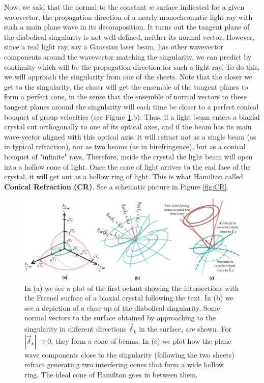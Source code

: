 \documentclass[11pt, a4paper, twoside]{article} %
\begin{document}
Now, we said that the normal to the constant $w$ surface indicated for a given wavevector, the propagation direction of a nearly monochromatic light ray with such a main plane wave in its decomposition. It turns out the tangent plane of the diabolical singularity is not well-defined, neither its normal vector. However, since a real light ray, say a Gaussian laser beam, has other wavevector components around the wavevector matching the singularity, we can predict by continuity which will be the propagation direction for such a light ray. To do this, we will approach the singularity from one of the sheets. Note that the closer we get to the singularity, the closer will get the ensemble of the tangent planes to form a perfect cone, in the sense that the ensemble of normal vectors to these tangent planes around the singularity will each time be closer to a perfect conical bouquet of group velocities (see Figure \ref{fig:concentric2}.b). Thus, if a light beam enters a biaxial crystal cut orthogonally to one of its optical axes, and if the beam has its main wave-vector aligned with this optical axis, it will refract not as a single beam (as in typical refraction), nor as two beams (as in birefringence), but as a conical bouquet of "infinite" rays. Therefore, inside the crystal the light beam will open into a hollow cone of light. Once the cone of light arrives to the end face of the crystal, it will get out as a hollow ring of light. This is what Hamilton called {\bf Conical Refraction (CR)}. See a schematic picture in Figure \ref{fig:CR}.\vspace{-0.15cm}

\begin{figure}[h!] 
\center
    \includegraphics[width=0.95\linewidth]{bi.PNG}
    \caption{In (a) we see a plot of the first octant showing the intersections with the Fresnel surface of a biaxial crystal following the text. In (b) we see a depiction of a close-up of the diabolical singularity. Some normal vectors to the surface obtained by approaching to the singularity in different directions $\vec{\delta}_k$ in the surface, are shown. For $|\vec{\delta}_k|\rightarrow 0$, they form a cone of beams. In (c) we plot how the plane wave components close to the singularity (following the two sheets) refract generating two interfering cones that form a wide hollow ring. The ideal cone of Hamilton goes in between them.}
    \label{fig:concentric2}\vspace{-0.1cm}
\end{figure}
\end{document}
